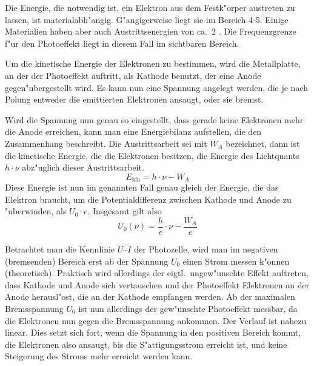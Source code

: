 \documentclass[a4paper,10pt]{article}
\begin{document}
  Die Energie, die notwendig ist, ein Elektron aus dem Festk"orper austreten zu lassen, ist materialabh"angig. G"angigerweise liegt sie im Bereich 4-5\electronvolt. Einige Materialien haben aber auch Austrittsenergien von ca.\ 2 \electronvolt. Die Frequenzgrenze f"ur den Photoeffekt liegt in diesem Fall im sichtbaren Bereich.

  Um die kinetische Energie der Elektronen zu bestimmen, wird die Metallplatte, an der der Photoeffekt auftritt, als Kathode benutzt, der eine Anode gegen"ubergestellt wird. Es kann nun eine Spannung angelegt werden, die je nach Polung entweder die emittierten Elektronen ansaugt, oder sie bremst.

  Wird die Spannung nun genau so eingestellt, dass gerade keine Elektronen mehr die Anode erreichen, kann man eine Energiebilanz aufstellen, die den Zusammenhang beschreibt. Die Austrittsarbeit sei mit $W_A$ bezeichnet, dann ist die kinetische Energie, die die Elektronen besitzen, die Energie des Lichtquants $h \cdot \nu$ abz"uglich dieser Austrittsarbeit.
  \begin{equation}
    E_{\text{kin}} = h \cdot \nu - W_A
  \end{equation}
  Diese Energie ist nun im genannten Fall genau gleich der Energie, die das Elektron braucht, um die Potentialdifferenz zwischen Kathode und Anode zu "uberwinden, als $U_0 \cdot e$. Insgesamt gilt also
  \begin{equation}
    U_0(\nu) = \frac{h}{e} \cdot \nu - \frac{W_A}{e} \label{hgerade}
  \end{equation}

  Betrachtet man die Kennlinie $U$--$I$ der Photozelle, wird man im negativen (bremsenden) Bereich erst ab der Spannung $U_0$ einen Strom messen k"onnen (theoretisch). Praktisch wird allerdings der eigtl.\ ungew"unschte Effekt auftreten, dass Kathode und Anode sich vertauschen und der Photoeffekt Elektronen an der Anode herausl"ost, die an der Kathode empfangen werden. Ab der maximalen Bremsspannung $U_0$ ist nun allerdings der gew"unschte Photoeffekt messbar, da die Elektronen nun gegen die Bremsspannung ankommen. Der Verlauf ist nahezu linear. Dies setzt sich fort, wenn die Spannung in den positiven Bereich kommt, die Elektronen also ansaugt, bis die S"attigungsstrom erreicht ist, und keine Steigerung des Stroms mehr erreicht werden kann.
\end{document}
